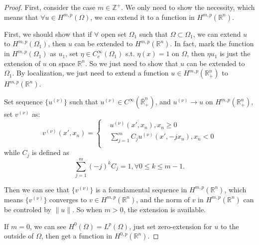 \documentclass[a4paper]{ctexart}
\begin{document}
\begin{proof}
    First, consider the case $m\in\mathbb{Z}^{+}$. We only need to show the necessity, which means that $\forall u\in H^{m,p}(\Omega)$, we can extend it to a function in $H^{m,p}(\mathbb{R}^{n})$.

    First, we should show that if $\forall$ open set $\Omega_{1}$ such that $\Omega\subset\Omega_{1}$, we can extend $u$ to $H^{m,p}(\Omega_{1})$, then $u$ can be extended to $H^{m,p}(\mathbb{R}^{n})$. In fact, mark the function in $H^{m,p}(\Omega_{1})$ as $u_{1}$, set $\eta\in C_{c}^{\infty}(\Omega_{1})$ s.t. $\eta(x)=1$ on $\Omega$, then $\eta u_{1}$ is just the extension of $u$ on space $\mathbb{R}^{n}$. So we just need to show that $u$ can be extended to $\Omega_{1}$. By localization, we just need to extend a function $u\in H^{m,p}(\mathbb{R}_{+}^{n})$ to $H^{m,p}(\mathbb{R}^{n})$. 

    Set sequence $\{u^{(\nu)}\}$ such that $u^{(\nu)}\in C^{\infty}(\bar{\mathbb{R}}_{+}^{n})$, 
    and $u^{(\nu)}\rightarrow u$ on $H^{m,p}(\mathbb{R}_{+}^{n})$, set $v^{(\nu)}$ as:
    \begin{equation}
        v^{(\nu)}(x',x_{n})=\left\{
            \begin{aligned}
                &u^{(\nu)}(x',x_{n}),x_{n}\ge0\\
                &\sum_{j=1}^{m}C_{j}u^{(\nu)}(x',-jx_{n}),x_{n}<0\\
            \end{aligned}
        \right.
    \end{equation}
    while $C_{j}$ is defined as 
    \begin{equation}
        \sum_{j=1}^{m}(-j)^{k}C_{j}=1,\forall 0\le k\le m-1.
    \end{equation}

    Then we can see that $\{v^{(\nu)}\}$ is a foundamental sequence in $H^{m,p}(\mathbb{R}^{n})$, which means $\{v^{(\nu)}\}$ converges to $v\in H^{m,p}(\mathbb{R}^{n})$, and the norm of $v$ in $H^{m,p}(\mathbb{R}^{n})$ can be controled by $\|u\|$. So when $m>0$, the extension is available.

    If $m=0$, we can see $H^{0}(\Omega)=L^{p}(\Omega)$, just set zero-extension for $u$ to the outside of $\Omega$, then get a function in $H^{0,p}(\mathbb{R}^{n})$.


\end{proof}
\end{document}
